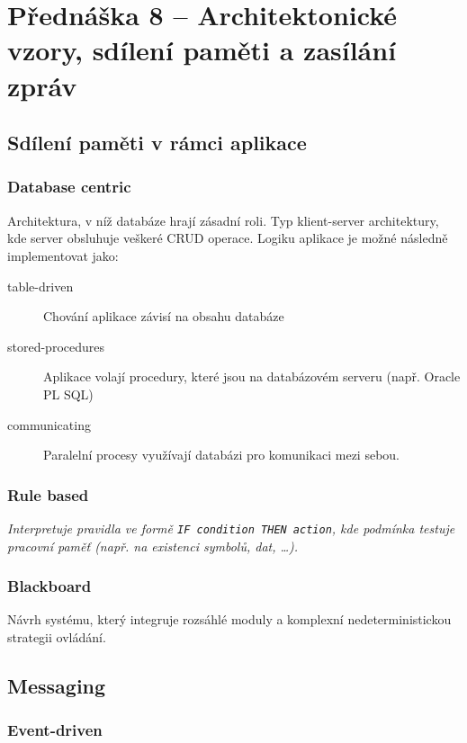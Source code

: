 \section{Přednáška 8 -- Architektonické vzory, sdílení paměti a zasílání zpráv}

\subsection{Sdílení paměti v rámci aplikace}

\subsubsection{Database centric}

Architektura, v níž databáze hrají zásadní roli.
Typ klient-server architektury, kde server obsluhuje veškeré CRUD operace.
Logiku aplikace je možné následně implementovat jako:

\begin{description}
    \item[table-driven] Chování aplikace závisí na obsahu databáze
    \item[stored-procedures] Aplikace volají procedury, které jsou na databázovém serveru (např. Oracle PL SQL)
    \item[communicating] Paralelní procesy využívají databázi pro komunikaci mezi sebou.
\end{description}

\subsubsection{Rule based}

\textit{Interpretuje pravidla ve formě \texttt{IF condition THEN action}, kde podmínka testuje pracovní paměť (např. na existenci symbolů, dat, \dots).}

\subsubsection{Blackboard}

Návrh systému, který integruje rozsáhlé moduly a komplexní nedeterministickou strategii ovládání.

\subsection{Messaging}

\subsubsection{Event-driven}

